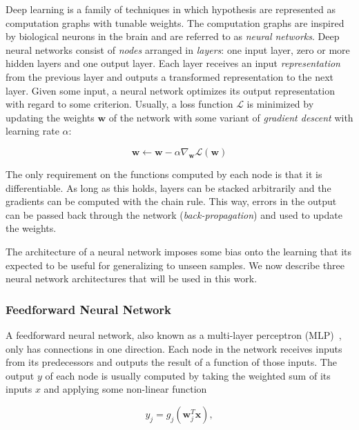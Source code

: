 Deep learning is a family of techniques in which hypothesis are represented as computation graphs with tunable weights.
The computation graphs are inspired by biological neurons in the brain and are referred to as \textit{neural networks}.
Deep neural networks consist of \textit{nodes} arranged in \textit{layers}: one input layer, zero or more hidden layers and one output layer.
Each layer receives an input \textit{representation}~\cite{bengio_representation_2014} from the previous layer and outputs a transformed representation to the next layer.
Given some input, a neural network optimizes its output representation with regard to some criterion.
Usually, a loss function \(\mathcal{L}\) is minimized by updating the weights \(\mathbf{w}\) of the network with some variant of \textit{gradient descent} with learning rate \(\alpha\):

\begin{equation}
    \mathbf{w} \leftarrow \mathbf{w} - \alpha \nabla_\mathbf{w} \mathcal{L}(\mathbf{w}) 
\end{equation}

The only requirement on the functions computed by each node is that it is differentiable.
As long as this holds, layers can be stacked arbitrarily and the gradients can be computed with the chain rule.
This way, errors in the output can be passed back through the network (\textit{back-propagation}) and used to update the weights.~\cite{russell_artificial_2021,goodfellow_deep_2016}

The architecture of a neural network imposes some bias onto the learning that its expected to be useful for generalizing to unseen samples.
We now describe three neural network architectures that will be used in this work.

\subsubsection{Feedforward Neural Network}

A feedforward neural network, also known as a multi-layer perceptron (MLP)~\cite{goodfellow_deep_2016}, only has connections in one direction.
Each node in the network receives inputs from its predecessors and outputs the result of a function of those inputs.
The output \(y\) of each node is usually computed by taking the weighted sum of its inputs \(x\) and applying some non-linear function

\begin{equation}
    y_j = g_j(\mathbf{w}_j^T \mathbf{x}),
\end{equation}

